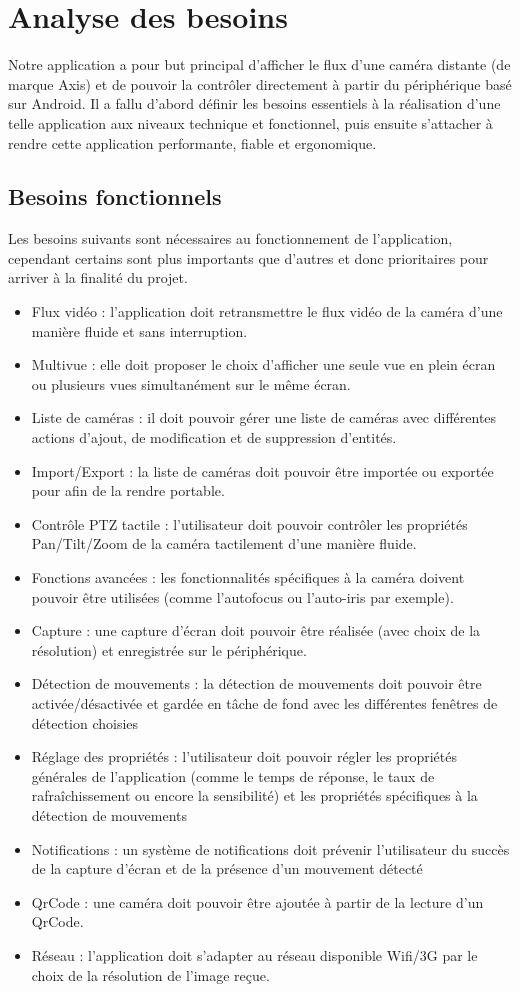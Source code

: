 \chapter{Analyse des besoins}
Notre application a pour but principal d'afficher le flux d'une caméra distante (de marque Axis) et de pouvoir la contrôler directement à partir du périphérique basé sur Android.
Il a fallu d'abord définir les besoins essentiels à la réalisation d'une telle application aux niveaux technique et fonctionnel, puis ensuite s'attacher à rendre cette application
performante, fiable et ergonomique.

\section{Besoins fonctionnels}
Les besoins suivants sont nécessaires au fonctionnement de l'application, cependant certains sont plus importants que d'autres et donc prioritaires pour arriver à la finalité du projet.
\begin{itemize}
  \item Flux vidéo : l'application doit retransmettre le flux vidéo de la caméra d'une manière fluide et sans interruption.
  \item Multivue : elle doit proposer le choix d'afficher une seule vue en plein écran ou plusieurs vues simultanément sur le même écran.
  \item Liste de caméras : il doit pouvoir gérer une liste de caméras avec différentes actions d'ajout, de modification et de suppression d'entités.
  \item Import/Export : la liste de caméras doit pouvoir être importée ou exportée pour afin de la rendre portable.
  \item Contrôle PTZ tactile : l'utilisateur doit pouvoir contrôler les propriétés Pan/Tilt/Zoom de la caméra tactilement d'une manière fluide.
  \item Fonctions avancées : les fonctionnalités spécifiques à la caméra doivent pouvoir être utilisées (comme l'autofocus ou l'auto-iris par exemple).
  \item Capture : une capture d'écran doit pouvoir être réalisée (avec choix de la résolution) et enregistrée sur le périphérique.
  \item Détection de mouvements : la détection de mouvements doit pouvoir être activée/désactivée et gardée en tâche de fond avec les différentes fenêtres de détection choisies
  \item Réglage des propriétés : l'utilisateur doit pouvoir régler les propriétés générales de l'application (comme le temps de réponse, le taux de rafraîchissement ou encore la sensibilité) et les propriétés spécifiques à la détection de mouvements
  \item Notifications : un système de notifications doit prévenir l'utilisateur du succès de la capture d'écran et de la présence d'un mouvement détecté 
  \item QrCode : une caméra doit pouvoir être ajoutée à partir de la lecture d'un QrCode.
  \item Réseau : l'application doit s'adapter au réseau disponible Wifi/3G par le choix de la résolution de l'image reçue.
\end{itemize}


